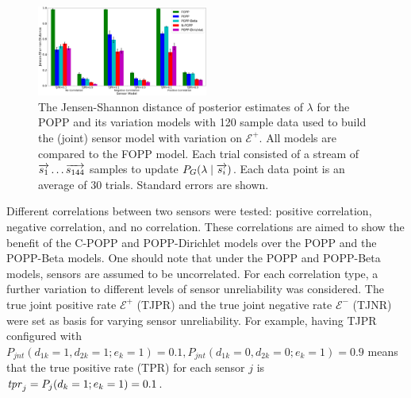 \begin{figure}[t!]
	\centering
	\includegraphics[width=0.5\textwidth]{./figures/tjpr_comparison_120_kl.png}
	\caption{The Jensen-Shannon distance of posterior estimates of $\lambda$ for the POPP and its variation models with 120 sample data used to build the (joint) sensor model with variation on $\mathcal{E^+}$. All models are compared to the FOPP model. Each trial consisted of a stream of $\protect\overrightarrow{s_1} \ldots \protect\overrightarrow{s_{144}}$ samples to update $P_G(\lambda \mid \protect\overrightarrow{s_i})$. Each data point is an average of 30 trials. Standard errors are shown.} 
	\label{fig:tjpr_comparison_120_kl}
\end{figure}

Different correlations between two sensors were tested: positive correlation, negative correlation, and no correlation. These correlations are aimed to show the benefit of the C-POPP and POPP-Dirichlet models over the POPP and the POPP-Beta models. One should note that under the POPP and POPP-Beta models, sensors are assumed to be uncorrelated. For each correlation type, a further variation to different levels of sensor unreliability was considered. The true joint positive rate $\mathcal{E^+}$ (TJPR) and the true joint negative rate $\mathcal{E^-}$ (TJNR) were set as basis for varying sensor unreliability. For example, having TJPR configured with $P_{jnt}(d_{1k}=1, d_{2k}=1 ; e_k=1) = 0.1, P_{jnt}(d_{1k}=0, d_{2k}=0 ; e_k=1) = 0.9$ means that the true positive rate (TPR) for each sensor $j$ is $\textrm{\textit{tpr}}_j = P_j(d_k = 1; e_k=1) = 0.1$.

